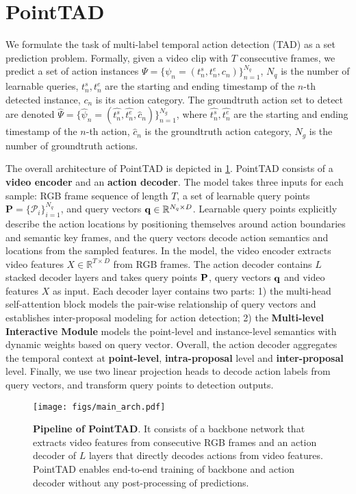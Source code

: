 \documentclass{article}
\begin{document}
\section{PointTAD}
\label{sec:method}

We formulate the task of multi-label temporal action detection (TAD) as a set prediction problem. Formally, given a video clip with $T$ consecutive frames, we predict a set of action instances $\Psi = \{\psi_n = (t_n^s, t_n^e, c_n)\}_{n=1}^{N_q}$, $N_q$ is the number of learnable queries, $t_n^s, t_n^e$ are the starting and ending timestamp of the $n$-th detected instance, $c_n$ is its action category. The groundtruth action set to detect are denoted $\hat{\Psi} =\{ \hat{\psi}_n = (\hat{t_n^s}, \hat{t_n^e}, \hat{c}_n)\}_{n=1}^{N_g}$, where $\hat{t_n^s}, \hat{t_n^e}$ are the starting and ending timestamp of the $n$-th action, $\hat{c}_n$ is the groundtruth action category, $N_g$ is the number of groundtruth actions. 

The overall architecture of PointTAD is depicted in \cref{fig:overview}. PointTAD consists of a {\bf video encoder} and an {\bf action decoder}. The model takes three inputs for each sample: RGB frame sequence of length $T$, a set of learnable query points $\mathbf{P} = \{\mathcal{P}_i\}_{i=1}^{N_q}$, and query vectors ${\bf q} \in \mathbb{R}^{N_q \times D}$. Learnable query points explicitly describe the action locations by positioning themselves around action boundaries and semantic key frames, and the query vectors decode action semantics and locations from the sampled features. In the model, the video encoder extracts video features $X\in \mathbb{R}^{T\times D}$ from RGB frames. The action decoder contains $L$ stacked decoder layers and takes query points ${\bf P}$, query vectors ${\bf q}$ and video features $X$ as input.
Each decoder layer contains two parts: 1) the {multi-head self-attention} block models the pair-wise relationship of query vectors and establishes inter-proposal modeling for action detection; 2) the {\bf Multi-level Interactive Module} models the point-level and instance-level semantics with dynamic weights based on query vector. 
Overall, the action decoder aggregates the temporal context at {\bf point-level}, {\bf intra-proposal} level and {\bf inter-proposal} level. 
Finally, we use two linear projection heads to decode action labels from query vectors, and transform query points to detection outputs.

\begin{figure}
  \centering
  \texttt{[image: figs/main\_arch.pdf]}
  \caption{{\bf Pipeline of PointTAD}. It consists of a backbone network that extracts video features from consecutive RGB frames and an action decoder of $L$ layers that directly decodes actions from video features. 
  PointTAD enables end-to-end training of backbone and action decoder without any post-processing of predictions. }
  \label{fig:overview}
  \vspace{-4mm}
\end{figure}
\end{document}
